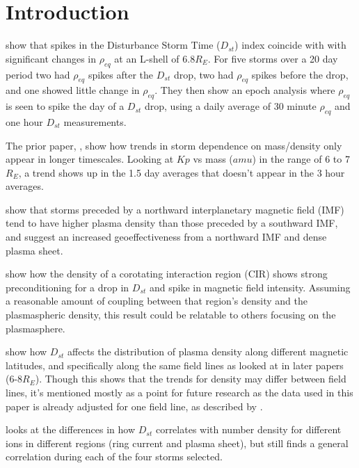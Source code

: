 \documentclass[10pt,twocolumn]{article}
\begin{document}
\section{Introduction}

\cite{Takahashi2010} show that spikes in the Disturbance Storm Time ($D_{st}$) index coincide with with significant changes in $\rho_{eq}$ at an L-shell of 6.8$R_E$. For five storms over a 20 day period two had $\rho_{eq}$ spikes after the $D_{st}$ drop, two had $\rho_{eq}$ spikes before the drop, and one showed little change in $\rho_{eq}$. They then show an epoch analysis where $\rho_{eq}$ is seen to spike the day of a $D_{st}$ drop, using a daily average of 30 minute $\rho_{eq}$ and one hour $D_{st}$ measurements. 

The prior paper, \cite{Takahashi2006}, show how trends in storm dependence on mass/density only appear in longer timescales. Looking at $Kp$ vs mass ($amu$) in the range of 6 to 7 $R_E$, a trend shows up in the 1.5 day averages that doesn't appear in the 3 hour averages.

\cite{Lavraud2006} show that storms preceded by a northward interplanetary magnetic field (IMF) tend to have higher plasma density than those preceded by a southward IMF, and suggest an increased geoeffectiveness from a northward IMF and dense plasma sheet.

\cite{Tsurutani1997} show how the density of a corotating interaction region (CIR) shows strong preconditioning for a drop in $D_{st}$ and spike in magnetic field intensity. Assuming a reasonable amount of coupling between that region's density and the plasmaspheric density, this result could be relatable to others focusing on the plasmasphere. 

\cite{Denton2006} show how $D_{st}$ affects the distribution of plasma density along different magnetic latitudes, and specifically along the same field lines as looked at in later papers (6-8$R_E$). Though this shows that the trends for density may differ between field lines, it's mentioned mostly as a point for future research as the data used in this paper is already adjusted for one field line, as described by \cite{Takahashi2010}.

\cite{Yao2008} looks at the differences in how $D_{st}$ correlates with number density for different ions in different regions (ring current and plasma sheet), but still finds a general correlation during each of the four storms selected.
\end{document}
